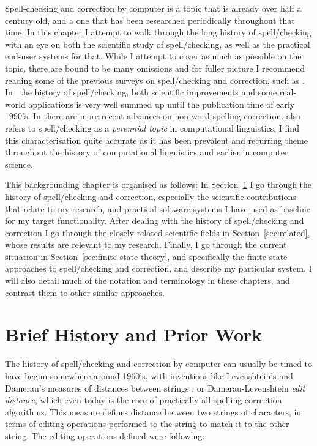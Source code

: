 \documentclass[officiallayout]{unihelcompling}
\begin{document}
Spell-checking and correction by computer is a topic that is already over half
a century old, and a one that has been researched periodically throughout that
time.  In this chapter I attempt to walk through the long history of
spell\-/checking with an eye on both the scientific study of spell\-/checking, as
well as the practical end-user systems for that. While I attempt to cover as
much as possible on the topic, there are bound to be many omissions and for
fuller picture I recommend reading some of the previous surveys on
spell\-/checking and correction, such as
\citet{kukich1992spelling,mitton2009ordering}.  In~\citet{kukich1992spelling}
the history of spell\-/checking, both scientific improvements and some real-world
applications is very well summed up until the publication time of early 1990's.
In \citet{mitton2009ordering} there are more recent advances on non-word
spelling correction.  \citet{kukich1992spelling} also refers to spell\-/checking
as a \emph{perennial topic} in computational linguistics, I find this
characterisation quite accurate as it has been prevalent and recurring theme
throughout the history of computational linguistics and earlier in computer
science.

This backgrounding chapter is organised as follows: In
Section~\ref{sec:history} I go through the history of spell\-/checking and
correction, especially the scientific contributions that relate to my research,
and practical software systems I have used as baseline for my target
functionality.  After dealing with the history of spell\-/checking and correction
I go through the closely related scientific fields in
Section~\ref{sec:related}, whose results are relevant to my research. Finally,
I go through the current situation in Section~\ref{sec:finite-state-theory},
and specifically the finite-state approaches to spell\-/checking and correction,
and describe my particular system. I will also detail much of the notation and
terminology in these chapters, and contrast them to other similar approaches.

\section{Brief History and Prior Work}
\label{sec:history}

The history of spell\-/checking and correction by computer can usually be timed
to have begun somewhere around 1960's, with inventions like Levenshtein's and
Damerau's measures of distances between strings
\citep{levenshtein1966binary,damerau1964technique}, or Damerau-Levenshtein
\emph{edit distance}, which even today is the core of practically all spelling
correction algorithms. This measure defines distance between two strings of
characters, in terms of editing operations performed to the string to match it
to the other string. The editing operations defined were following:
\end{document}
